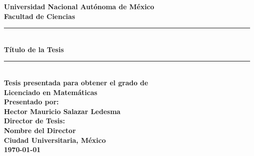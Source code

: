 
\begin{titlepage}
    \begin{center}

        {\LARGE \textbf{Universidad Nacional Autónoma de México}} \\[1.5cm]
        {\Large \textbf{Facultad de Ciencias}} \\[1cm]

        \rule{.8\linewidth}{0.4mm} \\[0.4cm]
        {\Huge \textbf{Título de la Tesis}} \\[0.2cm]
        \rule{.8\linewidth}{0.4mm} \\[1.5cm]

        \textbf{Tesis presentada para obtener el grado de} \\[0.5cm]
        {\Large \textbf{Licenciado en Matemáticas}} \\[2cm]

        \textbf{Presentado por:} \\[0.5cm]
        {\Large \textbf{Hector Mauricio Salazar Ledesma}} \\[1.5cm]

        \textbf{Director de Tesis:} \\[0.5cm]
        {\Large \textbf{Nombre del Director}} \\[2cm]

        {\Large \textbf{Ciudad Universitaria, México}} \\[0.5cm]
        {\Large \textbf{\today}} 

    \end{center}
\end{titlepage}
